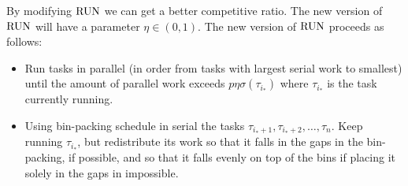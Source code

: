 By modifying $\operatorname{\text{RUN}}$ we can get a better competitive ratio.
The new version of $\operatorname{\text{RUN}}$ will have a parameter $\eta \in (0,1)$.
The new version of $\operatorname{\text{RUN}}$ proceeds as follows:
\begin{itemize}
  \item Run tasks in parallel (in order from tasks with largest
    serial work to smallest) until the amount of parallel work
    exceeds $p \eta \sigma(\tau_{i_*})$ where $\tau_{i_*}$ is the
    task currently running.
  \item Using bin-packing schedule in serial the tasks
    $\tau_{i_*+1}, \tau_{i_*+2}, \ldots, \tau_n$. Keep running
    $\tau_{i_*}$, but redistribute its work so that it falls in
    the gaps in the bin-packing, if possible, and so that it
    falls evenly on top of the bins if placing it solely in the
    gaps in impossible.
\end{itemize}

